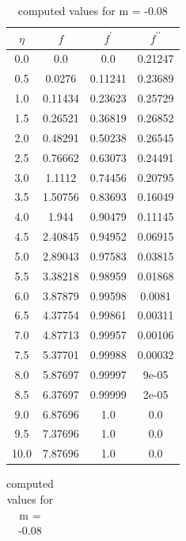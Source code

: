 \begin{table}
    \parbox{0.45\linewidth}{
        \centering
        \caption{computed values for m = -0.05}
        \begin{tabular}{|c|c|c|c|}
            \hline
            $\eta$ & $f$ & $f^\prime$ & $f^{\prime\prime}$ \\ \hline
            0.0 & 0.0 & 0.0 & 0.21247 \\ \hline
            0.5 & 0.0276 & 0.11241 & 0.23689 \\ \hline
            1.0 & 0.11434 & 0.23623 & 0.25729 \\ \hline
            1.5 & 0.26521 & 0.36819 & 0.26852 \\ \hline
            2.0 & 0.48291 & 0.50238 & 0.26545 \\ \hline
            2.5 & 0.76662 & 0.63073 & 0.24491 \\ \hline
            3.0 & 1.1112 & 0.74456 & 0.20795 \\ \hline
            3.5 & 1.50756 & 0.83693 & 0.16049 \\ \hline
            4.0 & 1.944 & 0.90479 & 0.11145 \\ \hline
            4.5 & 2.40845 & 0.94952 & 0.06915 \\ \hline
            5.0 & 2.89043 & 0.97583 & 0.03815 \\ \hline
            5.5 & 3.38218 & 0.98959 & 0.01868 \\ \hline
            6.0 & 3.87879 & 0.99598 & 0.0081 \\ \hline
            6.5 & 4.37754 & 0.99861 & 0.00311 \\ \hline
            7.0 & 4.87713 & 0.99957 & 0.00106 \\ \hline
            7.5 & 5.37701 & 0.99988 & 0.00032 \\ \hline
            8.0 & 5.87697 & 0.99997 & 9e-05 \\ \hline
            8.5 & 6.37697 & 0.99999 & 2e-05 \\ \hline
            9.0 & 6.87696 & 1.0 & 0.0 \\ \hline
            9.5 & 7.37696 & 1.0 & 0.0 \\ \hline
            10.0 & 7.87696 & 1.0 & 0.0 \\ \hline
        \end{tabular}
        \label{table_m1}
    }
    \hfill
    \parbox{0.45\linewidth}{
        \centering
        \caption{computed values for m = -0.08}
        \begin{tabular}{|c|c|c|c|}

\end{tabular}}
\end{table}
